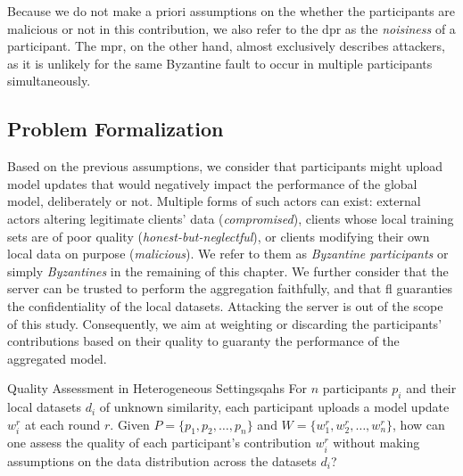 Because we do not make a priori assumptions on the whether the participants are malicious or not in this contribution, we also refer to the \gls{dpr} as the \emph{noisiness} of a participant.
The \gls{mpr}, on the other hand, almost exclusively describes attackers, as it is unlikely for the same Byzantine fault to occur in multiple participants simultaneously.


\subsection{Problem Formalization\label{sec:problem.formalization}}

Based on the previous assumptions, we consider that participants might upload model updates that would negatively impact the performance of the global model, deliberately or not.
Multiple forms of such actors can exist: external actors altering legitimate clients' data (\ie \emph{compromised}), clients whose local training sets are of poor quality (\ie \emph{honest-but-neglectful}), or clients modifying their own local data on purpose (\ie \emph{malicious}).
We refer to them as \emph{Byzantine participants} or simply \emph{Byzantines} in the remaining of this chapter.
We further consider that the server can be trusted to perform the aggregation faithfully, and that \gls{fl} guaranties the confidentiality of the local datasets.
Attacking the server is out of the scope of this study.
Consequently, we aim at weighting or discarding the participants' contributions based on their quality to guaranty the performance of the aggregated model.

\begin{problembox}{Quality Assessment in Heterogeneous Settings}{qahs}
  For $n$ participants $p_i$ and their local datasets $d_i$ of unknown similarity, each participant uploads a model update $w_i^r$ at each round $r$. Given $P = \lbrace p_1, p_2, \dots, p_n \rbrace$ and $W = \lbrace w_1^r, w_2^r, \dots, w_n^r \rbrace$, how can one assess the quality of each participant's contribution $w_i^r$ without making assumptions on the data distribution across the datasets $d_i$?
\end{problembox}